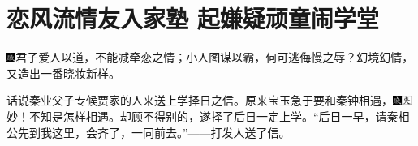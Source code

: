 

\chapter{恋风流情友入家塾 起嫌疑顽童闹学堂}

{\includegraphics[width=3mm]{../Images/00005}\kaishu 君子爱人以道，不能减牵恋之情；小人图谋以霸，何可逃侮慢之辱？幻境幻情，又造出一番晓妆新样。}

话说秦业父子专候贾家的人来送上学择日之信。原来宝玉急于要和秦钟相遇，{\includegraphics[width=3mm]{../Images/00005}\includegraphics[width=3mm]{../Images/00012}\footnotesize \kaishu 妙！不知是怎样相遇。}却顾不得别的，遂择了后日一定上学。``后日一早，请秦相公先到我这里，会齐了，一同前去。''------打发人送了信。

